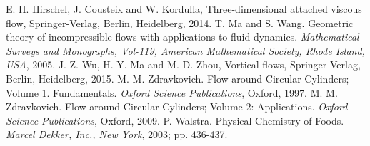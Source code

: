 \begin{thebibliography}{160}
 E. H. Hirschel, J. Cousteix and W. Kordulla, Three-dimensional attached viscous flow, Springer-Verlag, Berlin, Heidelberg, 2014.
%
 T. Ma and S. Wang. Geometric theory of incompressible flows with applications to fluid dynamics. {\em Mathematical Surveys and Monographs, Vol-119, American Mathematical Society, Rhode Island, USA}, 2005.
 J.-Z. Wu, H.-Y. Ma and M.-D. Zhou, Vortical flows, Springer-Verlag, Berlin, Heidelberg, 2015.
 M. M. Zdravkovich. Flow around Circular Cylinders; Volume 1. Fundamentals. {\em Oxford Science Publications}, Oxford, 1997.
 M. M. Zdravkovich. Flow around Circular Cylinders; Volume 2: Applications. {\em Oxford Science Publications}, Oxford, 2009.
 P. Walstra. Physical Chemistry of Foods. {\em Marcel Dekker, Inc., New York}, 2003; pp. 436-437.



\end{thebibliography}



%



